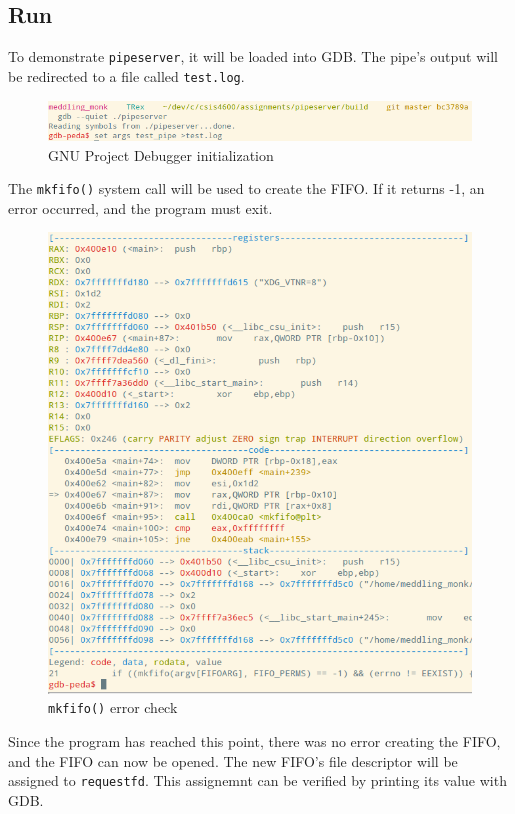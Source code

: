 \documentclass[letter,12pt,sffamily]{article}
\begin{document}
\subsection{Run}
To demonstrate \texttt{pipeserver}, it will be loaded into GDB. The pipe's output will be redirected to a file called \texttt{test.log}.
\begin{figure}[H]
	\centering
	\includegraphics[width=1\linewidth]{./images/3}
	\caption[starting_GDB]{GNU Project Debugger initialization}
	\label{fig:3}
\end{figure}
The \texttt{mkfifo()} system call will be used to create the FIFO. If it returns -1, an error occurred, and the program must exit. 
\begin{figure}[H]
	\centering
	\includegraphics[width=1\linewidth]{./images/4}
	\caption[mkfifo_error_check]{\texttt{mkfifo()} error check}
	\label{fig:4}
\end{figure}
Since the program has reached this point, there was no error creating the FIFO, and the FIFO can now be opened. The new
FIFO's file descriptor will be assigned to \texttt{requestfd}. This assignemnt can be verified by printing its value with GDB.
\end{document}
